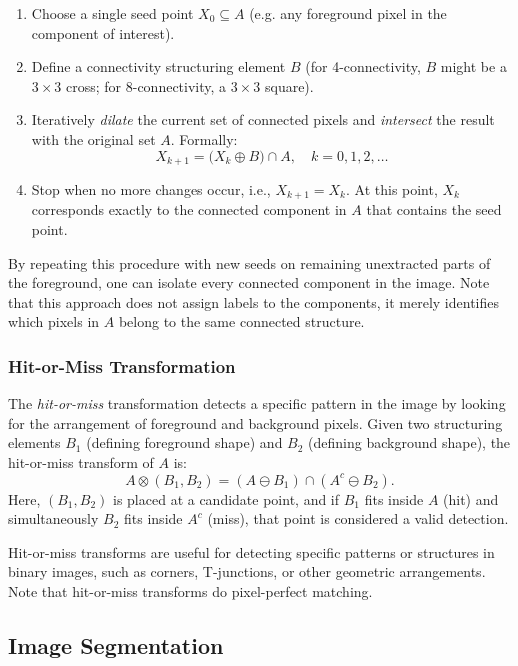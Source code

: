 \documentclass[a4paper,12pt]{article}
\begin{document}
\begin{enumerate}
    \item Choose a single seed point \( X_0 \subseteq A \) (e.g. any foreground pixel in the component of interest).
    \item Define a connectivity structuring element \(B\) (for 4-connectivity, \(B\) might be a \(3\times 3\) cross; for 8-connectivity, a \(3\times 3\) square).
    \item Iteratively \emph{dilate} the current set of connected pixels and \emph{intersect} the result with the original set \(A\). Formally:
    \[
      X_{k+1} = \bigl( X_k \oplus B \bigr) \cap A, \quad k = 0, 1, 2, \ldots
    \]
    \item Stop when no more changes occur, i.e., \( X_{k+1} = X_k \). At this point, \(X_k\) corresponds exactly to the connected component in \(A\) that contains the seed point.
\end{enumerate}

By repeating this procedure with new seeds on remaining unextracted parts of the foreground, one can isolate every connected component in the image. Note that this approach does not assign labels to the components, it merely identifies which pixels in \(A\) belong to the same connected structure.

\subsubsection{Hit-or-Miss Transformation}

The \emph{hit-or-miss} transformation detects a specific pattern in the image by looking for the arrangement of foreground and background pixels. Given two structuring elements \(B_1\) (defining foreground shape) and \(B_2\) (defining background shape), the hit-or-miss transform of \(A\) is:
\[
  A \otimes (B_1, B_2) = (A \ominus B_1) \cap (A^c \ominus B_2).
\]
Here, \((B_1, B_2)\) is placed at a candidate point, and if \(B_1\) fits inside \(A\) (hit) and simultaneously \(B_2\) fits inside \(A^c\) (miss), that point is considered a valid detection.

Hit-or-miss transforms are useful for detecting specific patterns or structures in binary images, such as corners, T-junctions, or other geometric arrangements. Note that hit-or-miss transforms do pixel-perfect matching.

\newpage

\subsection{Image Segmentation}
\end{document}
